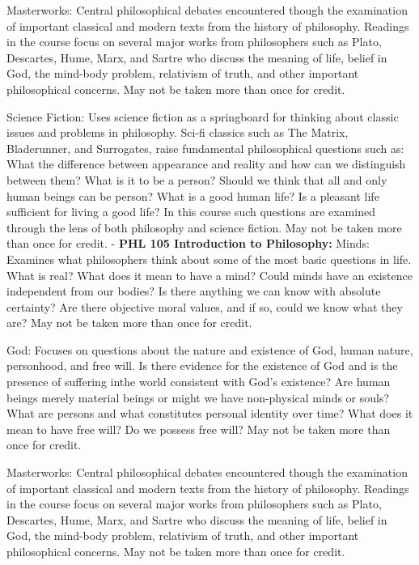 \documentclass[
  letterpaper,
]{scrbook}
\begin{document}
Masterworks: Central philosophical debates encountered though the
examination of important classical and modern texts from the history of
philosophy. Readings in the course focus on several major works from
philosophers such as Plato, Descartes, Hume, Marx, and Sartre who
discuss the meaning of life, belief in God, the mind-body problem,
relativism of truth, and other important philosophical concerns. May not
be taken more than once for credit.

Science Fiction: Uses science fiction as a springboard for thinking
about classic issues and problems in philosophy. Sci-fi classics such as
The Matrix, Bladerunner, and Surrogates, raise fundamental philosophical
questions such as: What the difference between appearance and reality
and how can we distinguish between them? What is it to be a person?
Should we think that all and only human beings can be person? What is a
good human life? Is a pleasant life sufficient for living a good life?
In this course such questions are examined through the lens of both
philosophy and science fiction. May not be taken more than once for
credit. - \textbf{PHL 105 Introduction to Philosophy:} Minds: Examines
what philosophers think about some of the most basic questions in life.
What is real? What does it mean to have a mind? Could minds have an
existence independent from our bodies? Is there anything we can know
with absolute certainty? Are there objective moral values, and if so,
could we know what they are? May not be taken more than once for credit.

God: Focuses on questions about the nature and existence of God, human
nature, personhood, and free will. Is there evidence for the existence
of God and is the presence of suffering inthe world consistent with
God's existence? Are human beings merely material beings or might we
have non-physical minds or souls? What are persons and what constitutes
personal identity over time? What does it mean to have free will? Do we
possess free will? May not be taken more than once for credit.

Masterworks: Central philosophical debates encountered though the
examination of important classical and modern texts from the history of
philosophy. Readings in the course focus on several major works from
philosophers such as Plato, Descartes, Hume, Marx, and Sartre who
discuss the meaning of life, belief in God, the mind-body problem,
relativism of truth, and other important philosophical concerns. May not
be taken more than once for credit.
\end{document}
